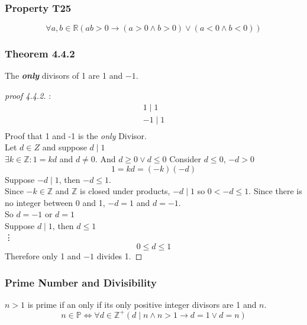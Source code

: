 \documentclass[12pt]{book}
\newcommand{\Z}{\mathbb{Z}}
\newcommand{\R}{\mathbb{R}}
\newcommand{\paren}[1]{\left( #1 \right)}
\begin{document}
\subsubsection{Property T25}
\[
\forall a,b  \in \R 
\paren{ab>0 \rightarrow\paren{a>0 \wedge b>0} \vee \paren{a<0 \wedge b<0}}
\]

\newpage

\subsubsection{Theorem 4.4.2}
The \textbf{\textit{only}} divisors of 1 are 1 and $-1$.
\begin{proof}[proof 4.4.2]:\\
    \begin{align*}
        1 \mid 1\\
        -1 \mid 1\\
    \end{align*}
    Proof that 1 and -1 is the \textit{only} Divisor.\\
    Let $d \in Z$ and suppose $d \mid 1$\\
    $\exists k \in \Z : 1 = kd$ and $d \neq 0$. And $d \geq 0 \vee d \leq 0$
    Consider $ d \leq 0$, $-d >0$
    \[
    1=kd=(-k)(-d)
    \]
    Suppose $ -d \mid 1 $, then $ -d \leq 1$.\\
    Since $-k \in \Z$ and $\Z$ is closed under products, $-d \mid 1$ so $ 0 < -d \leq 1$. Since there is no integer between 0 and 1, $-d = 1$ and $d = -1$.\\
    So $d=-1$ or $d=1$\\
    Suppose $d\mid 1$, then $d \leq 1$\\
    \vdots
    \[0 \leq d \leq 1\]
    Therefore only 1 and $-1$ divides 1. 
    
\end{proof}

\subsubsection{Prime Number and Divisibility}

$n>1$ is prime if an only if its only positive integer divisors are 1 and $n$.
\[
n \in \mathbb{P} \iff \forall d \in \Z^+  
\paren{d \mid n \wedge n > 1 \rightarrow d = 1 \vee d = n}
\]

\newpage
\end{document}
